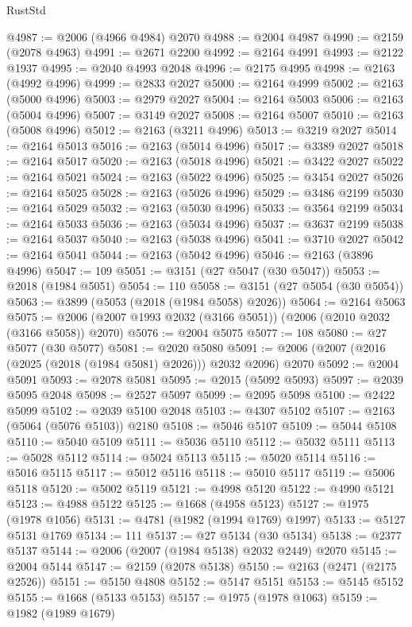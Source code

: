 \begin{lexlean}{RustStd}
\begin{coremodule}
@4987 := @2006 (@4966 @4984) @2070
@4988 := @2004 @4987
@4990 := @2159 (@2078 @4963)
@4991 := @2671 @2200
@4992 := @2164 @4991
@4993 := @2122 @1937
@4995 := @2040 @4993 @2048
@4996 := @2175 @4995
@4998 := @2163 (@4992 @4996)
@4999 := @2833 @2027
@5000 := @2164 @4999
@5002 := @2163 (@5000 @4996)
@5003 := @2979 @2027
@5004 := @2164 @5003
@5006 := @2163 (@5004 @4996)
@5007 := @3149 @2027
@5008 := @2164 @5007
@5010 := @2163 (@5008 @4996)
@5012 := @2163 (@3211 @4996)
@5013 := @3219 @2027
@5014 := @2164 @5013
@5016 := @2163 (@5014 @4996)
@5017 := @3389 @2027
@5018 := @2164 @5017
@5020 := @2163 (@5018 @4996)
@5021 := @3422 @2027
@5022 := @2164 @5021
@5024 := @2163 (@5022 @4996)
@5025 := @3454 @2027
@5026 := @2164 @5025
@5028 := @2163 (@5026 @4996)
@5029 := @3486 @2199
@5030 := @2164 @5029
@5032 := @2163 (@5030 @4996)
@5033 := @3564 @2199
@5034 := @2164 @5033
@5036 := @2163 (@5034 @4996)
@5037 := @3637 @2199
@5038 := @2164 @5037
@5040 := @2163 (@5038 @4996)
@5041 := @3710 @2027
@5042 := @2164 @5041
@5044 := @2163 (@5042 @4996)
@5046 := @2163 (@3896 @4996)
@5047 := 109
@5051 := @3151 (@27 @5047 (@30 @5047))
@5053 := @2018 (@1984 @5051)
@5054 := 110
@5058 := @3151 (@27 @5054 (@30 @5054))
@5063 := @3899 (@5053 (@2018 (@1984 @5058) @2026))
@5064 := @2164 @5063
@5075 := @2006 (@2007 @1993 @2032 (@3166 @5051)) (@2006 (@2010 @2032 (@3166 @5058)) @2070)
@5076 := @2004 @5075
@5077 := 108
@5080 := @27 @5077 (@30 @5077)
@5081 := @2020 @5080
@5091 := @2006 (@2007 (@2016 (@2025 (@2018 (@1984 @5081) @2026))) @2032 @2096) @2070
@5092 := @2004 @5091
@5093 := @2078 @5081
@5095 := @2015 (@5092 @5093)
@5097 := @2039 @5095 @2048
@5098 := @2527 @5097
@5099 := @2095 @5098
@5100 := @2422 @5099
@5102 := @2039 @5100 @2048
@5103 := @4307 @5102
@5107 := @2163 (@5064 (@5076 @5103)) @2180
@5108 := @5046 @5107
@5109 := @5044 @5108
@5110 := @5040 @5109
@5111 := @5036 @5110
@5112 := @5032 @5111
@5113 := @5028 @5112
@5114 := @5024 @5113
@5115 := @5020 @5114
@5116 := @5016 @5115
@5117 := @5012 @5116
@5118 := @5010 @5117
@5119 := @5006 @5118
@5120 := @5002 @5119
@5121 := @4998 @5120
@5122 := @4990 @5121
@5123 := @4988 @5122
@5125 := @1668 (@4958 @5123)
@5127 := @1975 (@1978 @1056)
@5131 := @4781 (@1982 (@1994 @1769) @1997)
@5133 := @5127 @5131 @1769
@5134 := 111
@5137 := @27 @5134 (@30 @5134)
@5138 := @2377 @5137
@5144 := @2006 (@2007 (@1984 @5138) @2032 @2449) @2070
@5145 := @2004 @5144
@5147 := @2159 (@2078 @5138)
@5150 := @2163 (@2471 (@2175 @2526))
@5151 := @5150 @4808
@5152 := @5147 @5151
@5153 := @5145 @5152
@5155 := @1668 (@5133 @5153)
@5157 := @1975 (@1978 @1063)
@5159 := @1982 (@1989 @1679)

\end{coremodule}
\end{lexlean}
